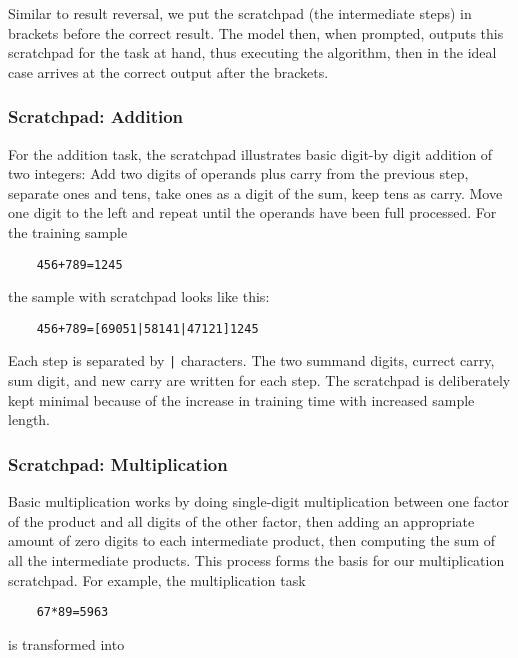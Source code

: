 Similar to result reversal, we put the scratchpad (the intermediate steps) in brackets before the correct result. The model then, when prompted, outputs this scratchpad for the task at hand, thus executing the algorithm, then in the ideal case arrives at the correct output after the brackets.

\subsubsection{Scratchpad: Addition}
\label{add_scratchpad}

For the addition task, the scratchpad illustrates basic digit-by digit addition of two integers: Add two digits of operands plus carry from the previous step, separate ones and tens, take ones as a digit of the sum, keep tens as carry. Move one digit to the left and repeat until the operands have been full processed. For the training sample

\begin{lstlisting}
    456+789=1245
\end{lstlisting}

\noindent
the sample with scratchpad looks like this:

\begin{lstlisting}
    456+789=[69051|58141|47121]1245
\end{lstlisting}

\noindent
Each step is separated by \verb!|! characters. The two summand digits, currect carry, sum digit, and new carry are written for each step.
The scratchpad is deliberately kept minimal because of the increase in training time with increased sample length.

\subsubsection{Scratchpad: Multiplication}
\label{mul_scratchpad}

Basic multiplication works by doing single-digit multiplication between one factor of the product and all digits of the other factor, then adding an appropriate amount of zero digits to each intermediate product, then computing the sum of all the intermediate products. This process forms the basis for our multiplication scratchpad. For example, the multiplication task

\begin{lstlisting}
    67*89=5963
\end{lstlisting}

\noindent
is transformed into

